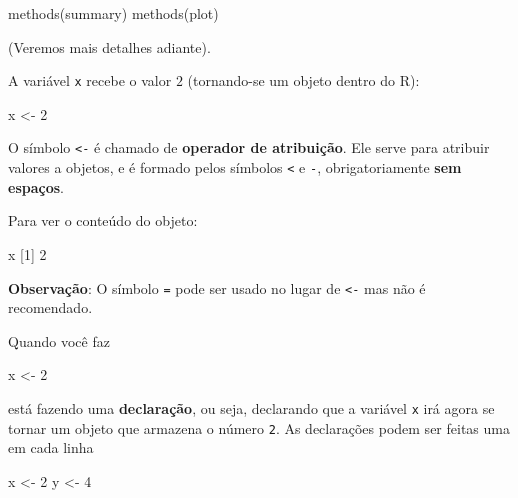 \documentclass[
  10pt,
  a4paper]{book}
\newenvironment{Shaded}{\begin{snugshade}}{\end{snugshade}}
\newcommand{\DecValTok}[1]{\textcolor[rgb]{0.00,0.00,0.81}{#1}}
\newcommand{\FunctionTok}[1]{\textcolor[rgb]{0.00,0.00,0.00}{#1}}
\newcommand{\NormalTok}[1]{#1}
\newcommand{\OtherTok}[1]{\textcolor[rgb]{0.56,0.35,0.01}{#1}}
\begin{document}
\begin{Shaded}
\begin{Highlighting}[]
\FunctionTok{methods}\NormalTok{(summary)}
\FunctionTok{methods}\NormalTok{(plot)}
\end{Highlighting}
\end{Shaded}

(Veremos mais detalhes adiante).

A variável \texttt{x} recebe o valor \(2\) (tornando-se um objeto dentro do R):

\begin{Shaded}
\begin{Highlighting}[]
\NormalTok{x }\OtherTok{\textless{}{-}} \DecValTok{2}
\end{Highlighting}
\end{Shaded}

O símbolo \texttt{\textless{}-} é chamado de \textbf{operador de atribuição}. Ele serve para
atribuir valores a objetos, e é formado pelos símbolos \texttt{\textless{}} e \texttt{-},
obrigatoriamente \textbf{sem espaços}.

Para ver o conteúdo do objeto:

\begin{Shaded}
\begin{Highlighting}[]
\NormalTok{x}
\NormalTok{[}\DecValTok{1}\NormalTok{] }\DecValTok{2}
\end{Highlighting}
\end{Shaded}

\textbf{Observação}: O símbolo \texttt{=} pode ser usado no lugar de \texttt{\textless{}-} mas não
é recomendado.

Quando você faz

\begin{Shaded}
\begin{Highlighting}[]
\NormalTok{x }\OtherTok{\textless{}{-}} \DecValTok{2}
\end{Highlighting}
\end{Shaded}

está fazendo uma \textbf{declaração}, ou seja, declarando que a variável \texttt{x}
irá agora se tornar um objeto que armazena o número \texttt{2}. As declarações
podem ser feitas uma em cada linha

\begin{Shaded}
\begin{Highlighting}[]
\NormalTok{x }\OtherTok{\textless{}{-}} \DecValTok{2}
\NormalTok{y }\OtherTok{\textless{}{-}} \DecValTok{4}
\end{Highlighting}
\end{Shaded}
\end{document}
